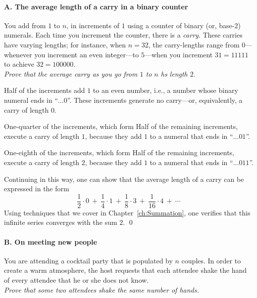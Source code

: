 \medskip

\paragraph{A. The average length of a carry in a binary counter}

%
You add from $1$ to $n$, in increments of $1$ using a counter of
binary (or, base-$2$) numerals.  Each time you increment the counter,
there is a {\it carry}.  These carries have varying lengths; for
instance, when $n = 32$, the carry-lengths range
from $0$---whenever you increment an even integer---to $5$---when you
increment $31 = 11111$ to achieve $32 = 100000$. \\
{\em Prove that the average carry as you go from $1$ to $n$ hs length $2$.}

\medskip


\noindent
Half of the increments add $1$ to an even number, i.e., a number whose
binary numeral ends in ``$ \ldots 0$''.  These increments generate no
carry---or, equivalently, a carry of length $0$.

\noindent
One-quarter of the increments, which form Half of the remaining
increments, execute a carry of length $1$, because they add $1$ to a
numeral that ends in ``$ \ldots 01$''.

\noindent
One-eighth of the increments, which form Half of the remaining
increments, execute a carry of length $2$, because they add $1$ to a
numeral that ends in ``$ \ldots 011$''.

Continuing in this way, one can show that the average length of a
carry can be expressed in the form
\[ 
\frac{1}{2} \cdot 0 \ + \ \frac{1}{4} \cdot 1 \ + \ \frac{1}{8} \cdot
3 \ + \ \frac{1}{16} \cdot 4 \ + \ \cdots
\]
Using techniques that we cover in Chapter~\ref{ch:Summation}, one
verifies that this infinite series converges with the sum $2$.  \qed


\medskip

\paragraph{B. On meeting new people}

%
You are attending a cocktail party that is populated by $n$ couples.
In order to create a warm atmosphere, the host requests that each
attendee shake the hand of every attendee that he or she does not
know.  \\
{\em Prove that some two attendees shake the same number of hands.}

